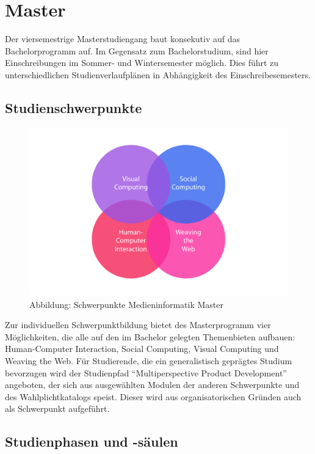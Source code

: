 \section{Master}\label{master}

Der viersemestrige Masterstudiengang baut konsekutiv auf das
Bachelorprogramm auf. Im Gegensatz zum Bachelorstudium, sind hier
Einschreibungen im Sommer- und Wintersemester möglich. Dies führt zu
unterschiedlichen Studienverlaufplänen in Abhängigkeit des
Einschreibesemesters.

\subsection{Studienschwerpunkte}\label{studienschwerpunkte}

\begin{figure}[htbp][htbp]
\centering
\includegraphics[width=\columnwidth]{../anhaenge/bilder/ma-schwerpunkte.pdf}
\caption{Abbildung: Schwerpunkte Medieninformatik Master}
\end{figure}

Zur individuellen Schwerpunktbildung bietet des Masterprogramm vier
Möglichkeiten, die alle auf den im Bachelor gelegten Themenbieten
aufbauen: Human-Computer Interaction, Social Computing, Visual Computing
und Weaving the Web. Für Studierende, die ein generalistisch geprägtes
Studium bevorzugen wird der Studienpfad ``Multiperspective Product
Development'' angeboten, der sich aus ausgewählten Modulen der anderen
Schwerpunkte und des Wahlplichtkatalogs speist. Dieser wird aus
organisatorischen Gründen auch als Schwerpunkt aufgeführt.

\subsection{Studienphasen und
-säulen}\label{studienphasen-und--suxe4ulen-1}

